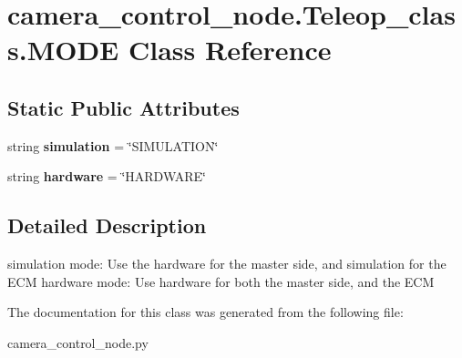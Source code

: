 \hypertarget{classcamera__control__node_1_1Teleop__class_1_1MODE}{\section{camera\-\_\-control\-\_\-node.\-Teleop\-\_\-class.\-M\-O\-D\-E Class Reference}
\label{classcamera__control__node_1_1Teleop__class_1_1MODE}
}
\subsection*{Static Public Attributes}
\begin{DoxyCompactItemize}
\item 
\hypertarget{classcamera__control__node_1_1Teleop__class_1_1MODE_aebd8f28abfe7e67656dee2af99662d5f}{string {\bfseries simulation} = \char`\"{}S\-I\-M\-U\-L\-A\-T\-I\-O\-N\char`\"{}}\label{classcamera__control__node_1_1Teleop__class_1_1MODE_aebd8f28abfe7e67656dee2af99662d5f}

\item 
\hypertarget{classcamera__control__node_1_1Teleop__class_1_1MODE_a69670746382719fdb4d8db762ee61d66}{string {\bfseries hardware} = \char`\"{}H\-A\-R\-D\-W\-A\-R\-E\char`\"{}}\label{classcamera__control__node_1_1Teleop__class_1_1MODE_a69670746382719fdb4d8db762ee61d66}

\end{DoxyCompactItemize}


\subsection{Detailed Description}
\begin{DoxyVerb}    simulation mode: Use the hardware for the master side, 
            and simulation for the ECM
    hardware mode: Use hardware for both the master side,
            and the ECM
\end{DoxyVerb}
 

The documentation for this class was generated from the following file\-:\begin{DoxyCompactItemize}
\item 
camera\-\_\-control\-\_\-node.\-py\end{DoxyCompactItemize}
